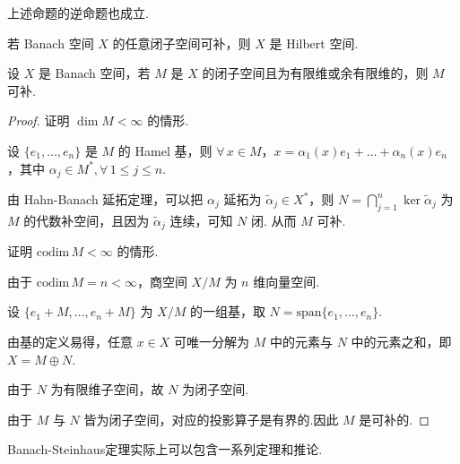 上述命题的逆命题也成立.
\begin{proposition}
    若 Banach 空间 $X$ 的任意闭子空间可补，则 $X$ 是 Hilbert 空间.
\end{proposition}

\begin{theorem}
    设 $X$ 是 Banach 空间，若 $M$ 是 $X$ 的闭子空间且为有限维或余有限维的，则 $M$ 可补.
\end{theorem}
\begin{proof}
    证明 $\dim M < \infty$ 的情形.\par
    设 $\{e_1, \dots, e_n\}$ 是 $M$ 的 Hamel 基，则 $\forall\, x \in M$，$x = \alpha_1(x) e_1 + \dots + \alpha_n(x) e_n$，其中 $\alpha_j \in M^*, \forall\, 1 \leq j \leq n$.\par
    由 Hahn-Banach 延拓定理，可以把 $\alpha_j$ 延拓为 $\tilde{\alpha}_j \in X^*$，则 $N = \bigcap_{j=1}^n \ker \tilde{\alpha}_j$ 为 $M$ 的代数补空间，且因为 $\tilde{\alpha}_j$ 连续，可知 $N$ 闭. 从而 $M$ 可补.\par

    证明 $\mathrm{codim}\, M < \infty$ 的情形.\par
    由于 $\mathrm{codim}\, M = n < \infty$，商空间 $X/M$ 为 $n$ 维向量空间.\par
    设 $\{e_1 + M, \dots, e_n + M\}$ 为 $X/M$ 的一组基，取 $N = \mathrm{span}\{e_1, \dots, e_n\}$.\par
    由基的定义易得，任意 $x \in X$ 可唯一分解为 $M$ 中的元素与 $N$ 中的元素之和，即 $X = M \oplus N$.\par
    由于 $N$ 为有限维子空间，故 $N$ 为闭子空间.\par
    由于 $M$ 与 $N$ 皆为闭子空间，对应的投影算子是有界的.因此 $M$ 是可补的.
\end{proof}

Banach-Steinhaus定理实际上可以包含一系列定理和推论.

